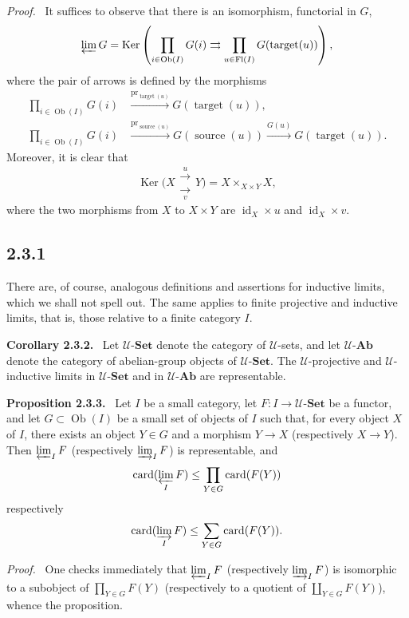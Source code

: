 \documentclass[11pt]{article}
\newcommand{\U}{\mathcal{U}}
\newcommand{\Set}{\mathbf{Set}}
\newcommand{\Ab}{\mathbf{Ab}}
\newcommand{\Ob}{\operatorname{Ob}}
\newcommand{\Ker}{\operatorname{Ker}}
\newcommand{\id}{\operatorname{id}}
\newcommand{\pr}{\operatorname{pr}}
\newcommand{\source}{\operatorname{source}}
\newcommand{\target}{\operatorname{target}}
\newcommand{\Fl}{\operatorname{Fl}}
\newenvironment{statement}[1]{\par\medskip\noindent\textbf{#1.}\ }{\par\medskip}
\newenvironment{proofsketch}{\par\noindent\emph{Proof.}\ }{\par\medskip}
\begin{document}
\begin{proofsketch}
It suffices to observe that there is an isomorphism, functorial in $G$,
\[
\varprojlim G=\Ker\left(\prod_{i\in\Ob(I)}G(i)\rightrightarrows \prod_{u\in\Fl(I)}G(\target(u))\right),
\]
where the pair of arrows is defined by the morphisms
\begin{align*}
\prod_{i\in\Ob(I)}G(i)&\xrightarrow{\pr_{\target(u)}}G(\target(u)),\\
\prod_{i\in\Ob(I)}G(i)&\xrightarrow{\pr_{\source(u)}}G(\source(u))\xrightarrow{G(u)}G(\target(u)).
\end{align*}
Moreover, it is clear that
\[
\Ker\bigl(X\mathrel{\substack{\xrightarrow{u}\\[-.4ex]\xrightarrow[v]{}}}Y\bigr)=X\times_{X\times Y}X,
\]
where the two morphisms from $X$ to $X\times Y$ are $\id_X\times u$ and $\id_X\times v$.
\end{proofsketch}

\subsection*{2.3.1}
There are, of course, analogous definitions and assertions for inductive limits, which we shall not spell out. The same applies to finite projective and inductive limits, that is, those relative to a finite category $I$.

\begin{statement}{Corollary 2.3.2}
Let $\U$-$\Set$ denote the category of $\U$-sets, and let $\U$-$\Ab$ denote the category of abelian-group objects of $\U$-$\Set$. The $\U$-projective and $\U$-inductive limits in $\U$-$\Set$ and in $\U$-$\Ab$ are representable.
\end{statement}

\begin{statement}{Proposition 2.3.3}
Let $I$ be a small category, let $F:I\to\U$-$\Set$ be a functor, and let $G\subset\Ob(I)$ be a small set of objects of $I$ such that, for every object $X$ of $I$, there exists an object $Y\in G$ and a morphism $Y\to X$ (respectively $X\to Y$). Then $\varprojlim_I F$ (respectively $\varinjlim_I F$) is representable, and
\[
\operatorname{card}(\varprojlim_I F)\leq \prod_{Y\in G}\operatorname{card}(F(Y))
\]
respectively
\[
\operatorname{card}(\varinjlim_I F)\leq \sum_{Y\in G}\operatorname{card}(F(Y)).
\]
\end{statement}

\begin{proofsketch}
One checks immediately that $\varprojlim_I F$ (respectively $\varinjlim_I F$) is isomorphic to a subobject of $\prod_{Y\in G}F(Y)$ (respectively to a quotient of $\coprod_{Y\in G}F(Y)$), whence the proposition.
\end{proofsketch}
\end{document}
